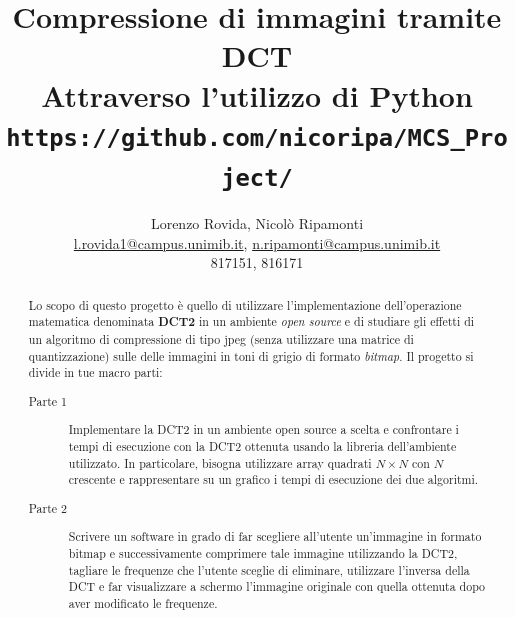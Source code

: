 \documentclass[preprint,12pt]{elsarticle}
\begin{document}
	

\begin{frontmatter}

\title{Compressione di immagini tramite DCT\\
\large{Attraverso l'utilizzo di Python}
\vspace{5mm}\\ \normalsize{\texttt{https://github.com/nicoripa/MCS\_Project/}}}

\author{Lorenzo Rovida, Nicolò Ripamonti\\
	\small{ \href{mailto:l.rovida1@campus.unimib.it}{l.rovida1@campus.unimib.it},  \href{mailto:n.ripamonti@campus.unimib.it}{n.ripamonti@campus.unimib.it}\\817151, 816171}}

\address{Dipartimento di Informatica, Sistemi e Comunicazione, Universitá degli Studi di Milano-Bicocca, Milano, Italia}


\begin{abstract}
Lo scopo di questo progetto è quello di utilizzare l’implementazione dell'operazione matematica denominata \textbf{DCT2} in un ambiente \textit{open source} e di studiare gli effetti di un algoritmo di compressione di tipo jpeg (senza utilizzare una matrice di quantizzazione) sulle delle immagini in toni di grigio di formato \textit{bitmap}.
Il progetto si divide in tue macro parti:
\begin{description}
\item[Parte 1] Implementare la DCT2  in un ambiente open source a scelta e confrontare i tempi di esecuzione con la DCT2 ottenuta usando la libreria dell’ambiente utilizzato. In particolare, bisogna utilizzare array quadrati $N \times N$ con $N$ crescente e rappresentare su un grafico i tempi di esecuzione dei due algoritmi.
\item[Parte 2] Scrivere un software in grado di far scegliere all'utente un'immagine in formato bitmap e successivamente comprimere tale immagine utilizzando la DCT2, tagliare le frequenze che l'utente sceglie di eliminare, utilizzare l'inversa della DCT e far visualizzare a schermo l'immagine originale con quella ottenuta dopo aver modificato le frequenze.
\end{description}
\end{abstract}

\end{frontmatter}
\end{document}
